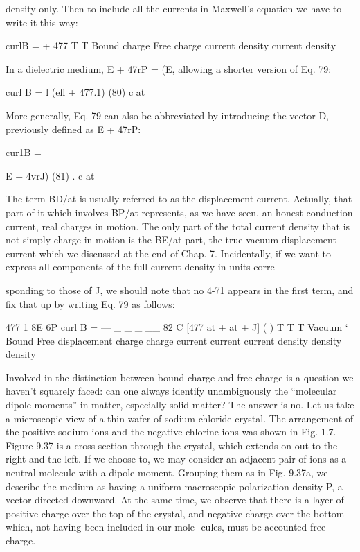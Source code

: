 {{{density only. Then to include all the currents in Maxwell's equation
we have to write it this way:

\begin{equation}
\end{equation}
curlB =  + 477%
T T
Bound charge Free charge
current density current density

In a dielectric medium, E + 47rP = (E, allowing a shorter version
of Eq. 79:

\begin{equation}
\end{equation}
curl B = l (efl + 477.1) (80)
c at

More generally, Eq. 79 can also be abbreviated by introducing the
vector D, previously defined as E + 47rP:

\begin{equation}
\end{equation}
cur1B = {E + 4vrJ) (81)
. c at

The term BD/at is usually referred to as the displacement current.
Actually, that part of it which involves BP/at represents, as we have
seen, an honest conduction current, real charges in motion. The
only part of the total current density that is not simply charge in
motion is the BE/at part, the true vacuum displacement current
which we discussed at the end of Chap. 7. Incidentally, if we want
to express all components of the full current density in units corre-

sponding to those of J, we should note that no 4-71 appears in the first
term, and fix that up by writing Eq. 79 as follows:

\begin{equation}
\end{equation}
477 1 8E 6P
curl B =  --- _ _ _ __ 82
C [477 at + at + J] ( )
T T T
Vacuum ‘ Bound Free
displacement charge charge
current current current
density density density

Involved in the distinction between bound charge and free charge
is a question we haven't squarely faced: can one always identify
unambiguously the ``molecular dipole moments'' in matter, especially
solid matter? The answer is no. Let us take a microscopic view of
a thin wafer of sodium chloride crystal. The arrangement of the
positive sodium ions and the negative chlorine ions was shown in
Fig. 1.7. Figure 9.37 is a cross section through the crystal, which
extends on out to the right and the left. If we choose to, we may
consider an adjacent pair of ions as a neutral molecule with a dipole
moment. Grouping them as in Fig. 9.37a, we describe the medium
as having a uniform macroscopic polarization density P, a vector
directed downward. At the same time, we observe that there is a
layer of positive charge over the top of the crystal, and negative
charge over the bottom which, not having been included in our mole-
cules, must be accounted free charge.

}}}}
